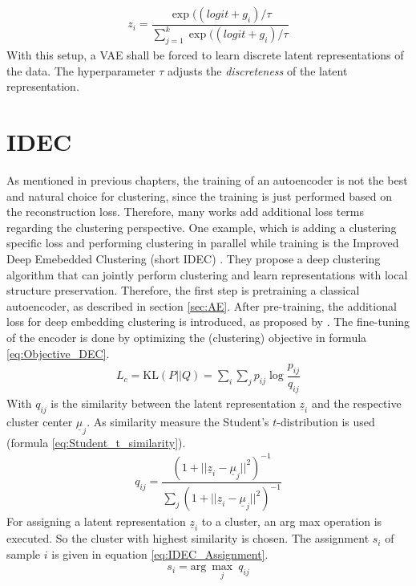 \documentclass[12pt,DIV14,BCOR12mm,a4paper,footexclude,headinclude,halfparskip-,twoside,openright,cleardoubleempty,idxtotoc,bibtotoc,listtotoc,abstracton]{scrreprt} %
\numberwithin{equation}{chapter}
\begin{document}
\begin{align}
	z_i = \dfrac{\exp((logit+g_i)/\tau}{\sum_{j=1}^{k}\exp((logit+g_i)/\tau}\label{eq:VAE_GumbelSoftmaxSample}
\end{align}
With this setup, a VAE shall be forced to learn discrete latent representations of the data. The hyperparameter $\tau$ adjusts the \textit{discreteness} of the latent representation.
\section{IDEC}
As mentioned in previous chapters, the training of an autoencoder is not the best and natural choice for clustering, since the training is just performed based on the reconstruction loss. Therefore, many works add additional loss terms regarding the clustering perspective. One example, which is adding a clustering specific loss and performing clustering in parallel while training is the Improved Deep Emebedded Clustering (short IDEC) \cite{Guo17IDEC}. They propose a deep clustering algorithm that can jointly perform clustering and learn representations with local structure preservation. Therefore, the first step is pretraining a classical autoencoder, as described in section \ref{sec:AE}. After pre-training, the additional loss for deep embedding clustering is introduced, as proposed by \cite{Xie16DEC}. The fine-tuning of the encoder is done by optimizing the (clustering) objective in formula \ref{eq:Objective_DEC}.
\begin{align}
	L_c = \textrm{KL}(P||Q) = \sum_i\sum_j p_{ij}\log\dfrac{p_{ij}}{q_{ij}}\label{eq:Objective_DEC}
\end{align}
With $q_{ij}$ is the similarity between the latent representation $\underline{z}_i$ and the respective cluster center $\underline{\mu}_j$. As similarity measure the Student's $t$-distribution is used \cite{t-SNE} (formula \ref{eq:Student_t_similarity}).
\begin{align}
	q_{ij}=\dfrac{(1+||\underline{z}_i-\underline{\mu}_j||^2)^{-1}}{\sum_j(1+||\underline{z}_i-\underline{\mu}_j||^2)^{-1}}\label{eq:Student_t_similarity}
\end{align}
For assigning a latent representation $\underline{z}_i$ to a cluster, an arg max operation is executed. So the cluster with highest similarity is chosen. The assignment $s_i$ of sample $i$ is given in equation \ref{eq:IDEC_Assignment}.
\begin{align}
	s_i = \textrm{arg}\ \underset{j}\max\ q_{ij}\label{eq:IDEC_Assignment}
\end{align}
\end{document}

